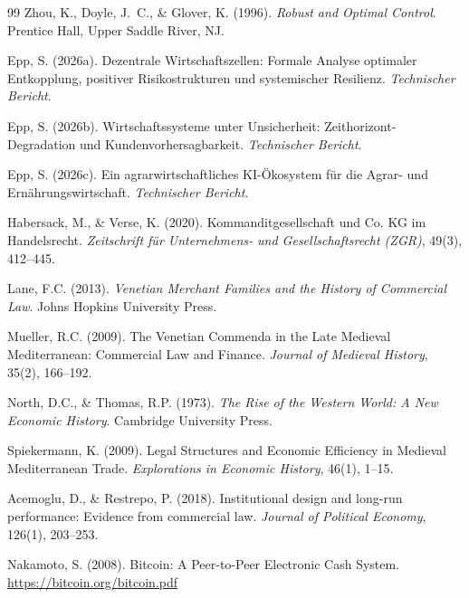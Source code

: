 \documentclass[a4paper, 12pt, twoside, openright]{report}
\theoremstyle{definition}
\theoremstyle{definition}
\begin{document}
\begin{thebibliography}{99}
Zhou, K., Doyle, J.~C., \& Glover, K. (1996).
\newblock \emph{Robust and Optimal Control}.
\newblock Prentice Hall, Upper Saddle River, NJ.

Epp, S. (2026a).
\newblock Dezentrale Wirtschaftszellen: Formale Analyse optimaler Entkopplung,
          positiver Risikostrukturen und systemischer Resilienz.
\newblock \emph{Technischer Bericht}.

Epp, S. (2026b).
\newblock Wirtschaftssysteme unter Unsicherheit: Zeithorizont-Degradation
          und Kundenvorhersagbarkeit.
\newblock \emph{Technischer Bericht}.

Epp, S. (2026c).
\newblock Ein agrarwirtschaftliches KI-Ökosystem für die Agrar- und Ernährungswirtschaft.
\newblock \emph{Technischer Bericht}.

Habersack, M., \& Verse, K. (2020).
\newblock Kommanditgesellschaft und Co. KG im Handelsrecht.
\newblock \emph{Zeitschrift für Unternehmens- und Gesellschaftsrecht (ZGR)}, 49(3), 412--445.

Lane, F.C. (2013).
\newblock \emph{Venetian Merchant Families and the History of Commercial Law}.
\newblock Johns Hopkins University Press.

Mueller, R.C. (2009).
\newblock The Venetian Commenda in the Late Medieval Mediterranean: Commercial Law and Finance.
\newblock \emph{Journal of Medieval History}, 35(2), 166--192.

North, D.C., \& Thomas, R.P. (1973).
\newblock \emph{The Rise of the Western World: A New Economic History}.
\newblock Cambridge University Press.

Spiekermann, K. (2009).
\newblock Legal Structures and Economic Efficiency in Medieval Mediterranean Trade.
\newblock \emph{Explorations in Economic History}, 46(1), 1--15.

Acemoglu, D., \& Restrepo, P. (2018).
\newblock Institutional design and long-run performance: Evidence from commercial law.
\newblock \emph{Journal of Political Economy}, 126(1), 203--253.

Nakamoto, S. (2008).
\newblock Bitcoin: A Peer-to-Peer Electronic Cash System.
\newblock \url{https://bitcoin.org/bitcoin.pdf}


\end{thebibliography}
\end{document}

